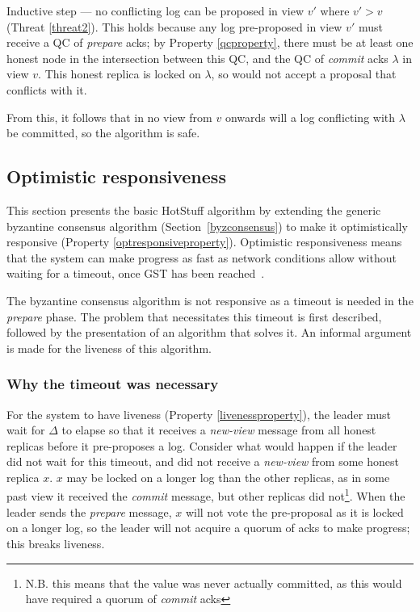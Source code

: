 Inductive step --- no conflicting log can be proposed in view $v'$ where $v' > v$ (Threat \ref{threat2}). This holds because any log pre-proposed in view $v'$ must receive a QC of \textit{prepare} acks; by Property \ref{qcproperty}, there must be at least one honest node in the intersection between this QC, and the QC of \textit{commit} acks $\lambda$ in view $v$. This honest replica is locked on $\lambda$, so would not accept a proposal that conflicts with it.

From this, it follows that in no view from $v$ onwards will a log conflicting with $\lambda$ be committed, so the algorithm is safe.

\subsection{Optimistic responsiveness} \label{optresponsive}
This section presents the basic HotStuff algorithm by extending the generic byzantine consensus algorithm (Section~\ref{byzconsensus}) to make it optimistically responsive (Property \ref{optresponsiveproperty}). Optimistic responsiveness means that the system can make progress as fast as network conditions allow without waiting for a timeout, once GST has been reached~\cite{passThunderellaBlockchainsOptimistic2018}.

The byzantine consensus algorithm is not responsive as a timeout is needed in the \textit{prepare} phase. The problem that necessitates this timeout is first described, followed by the presentation of an algorithm that solves it. An informal argument is made for the liveness of this algorithm.

\subsubsection{Why the timeout was necessary}
For the system to have liveness (Property \ref{livenessproperty}), the leader must wait for $\Delta$ to elapse so that it receives a \textit{new-view} message from all honest replicas before it pre-proposes a log. Consider what would happen if the leader did not wait for this timeout, and did not receive a \textit{new-view} from some honest replica $x$. $x$ may be locked on a longer log than the other replicas, as in some past view it received the \textit{commit} message, but other replicas did not\footnote{N.B. this means that the value was never actually committed, as this would have required a quorum of \textit{commit} acks}. When the leader sends the \textit{prepare} message, $x$ will not vote the pre-proposal as it is locked on a longer log, so the leader will not acquire a quorum of acks to make progress; this breaks liveness.

